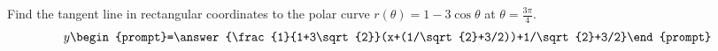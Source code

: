 \documentclass{ximera}
\author{Gregory Hartman \and Matthew Carr}
\begin{document}
\begin{exercise}





Find the tangent line in rectangular coordinates to the polar curve $r(\theta)=1-3\cos\theta$ at $\theta=\frac{3\pi}{4}$. 
 \[
y\begin{prompt}=\answer{\frac{1}{1+3\sqrt{2}}(x+(1/\sqrt{2}+3/2))+1/\sqrt{2}+3/2}\end{prompt}
 \]      
 
\end{exercise}
\end{document}
